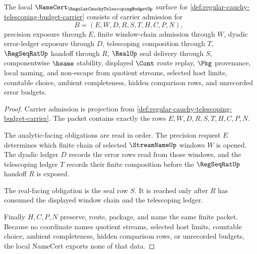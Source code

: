 \begin{theorem}
\label{thm:regular-cauchy-telescoping-budget-namecert-obligations}
The local $\NameCert_{\RegularCauchyTelescopingBudgetUp}$ surface for \autoref{def:regular-cauchy-telescoping-budget-carrier} consists of carrier admission for
$$
B=(E,W,D,R,S,T,H,C,P,N),
$$
precision exposure through $E$, finite window-chain admission through $W$, dyadic error-ledger exposure through $D$, telescoping composition through $T$, $\RegSeqRatUp$ handoff through $R$, $\RealUp$ seal delivery through $S$, componentwise $\hsame$ stability, displayed $\Cont$ route replay, $\Pkg$ provenance, local naming, and non-escape from quotient streams, selected host limits, countable choice, ambient completeness, hidden comparison rows, and unrecorded error budgets.
\end{theorem}
\begin{proof}
Carrier admission is projection from \autoref{def:regular-cauchy-telescoping-budget-carrier}. The packet contains exactly the rows $E,W,D,R,S,T,H,C,P,N$.

The analytic-facing obligations are read in order. The precision request $E$ determines which finite chain of selected $\StreamNameUp$ windows $W$ is opened. The dyadic ledger $D$ records the error rows read from those windows, and the telescoping ledger $T$ records their finite composition before the $\RegSeqRatUp$ handoff $R$ is exposed.

The real-facing obligation is the seal row $S$. It is reached only after $R$ has consumed the displayed window chain and the telescoping ledger.

Finally $H,C,P,N$ preserve, route, package, and name the same finite packet. Because no coordinate names quotient streams, selected host limits, countable choice, ambient completeness, hidden comparison rows, or unrecorded budgets, the local NameCert exports none of that data.
\end{proof}

